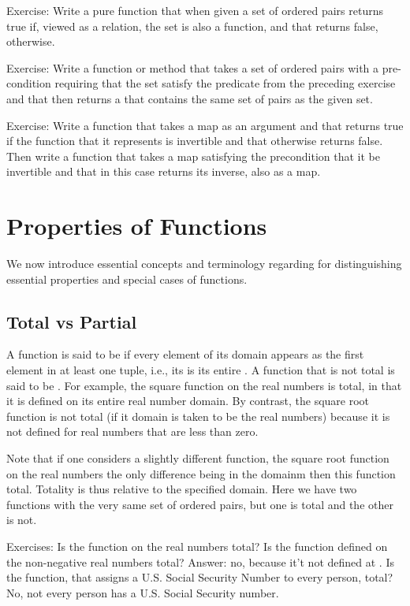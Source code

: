 \documentclass[letterpaper,10pt,english]{sphinxmanual}
\begin{document}
Exercise: Write a pure function that when given a set of ordered pairs
returns true if, viewed as a relation, the set is also a function, and
that returns false, otherwise.

Exercise: Write a function or method that takes a set of ordered pairs
with a pre-condition requiring that the set satisfy the predicate from
the preceding exercise and that then returns a  that contains the
same set of pairs as the given set.

Exercise: Write a function that takes a map as an argument and that
returns true if the function that it represents is invertible and that
otherwise returns false. Then write a function that takes a map
satisfying the precondition that it be invertible and that in this
case returns its inverse, also as a map.


\section{Properties of Functions}
\label{\detokenize{07-set-theory:properties-of-functions}}
We now introduce essential concepts and terminology regarding for
distinguishing essential properties and special cases of functions.


\subsection{Total vs Partial}
\label{\detokenize{07-set-theory:total-vs-partial}}
A function is said to be  if every element of its domain
appears as the first element in at least one tuple, i.e., its
 is its entire .  A function that is not total is
said to be . For example, the square function on the real
numbers is total, in that it is defined on its entire real number
domain. By contrast, the square root function is not total (if it
domain is taken to be the real numbers) because it is not defined for
real numbers that are less than zero.

Note that if one considers a slightly different function, the square
root function on the  real numbers the only difference
being in the domainm then this function  total. Totality is thus
relative to the specified domain. Here we have two functions with the
very same set of ordered pairs, but one is total and the other is not.

Exercises: Is the function  on the real numbers total?  Is the
 function defined on the non-negative real numbers total? Answer:
no, because it’t not defined at .  Is the  function, that
assigns a U.S. Social Security Number to every person, total? No, not
every person has a U.S. Social Security number.
\end{document}
